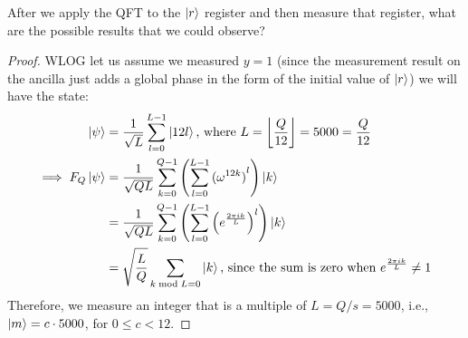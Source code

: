 \begin{solution}[label=ques:3d]
  \begin{question}
    After we apply the QFT to the $\ket{r}$ register and then measure that register, what are the possible results that we could observe?
  \end{question}
  \tcblower{}
  \begin{proof}
    WLOG let us assume we measured $y = 1$ (since the measurement result on the ancilla just adds a global phase in the form of the initial value of $\ket{r}$) we will have the state:
    \begin{equation}
      \begin{split}
        \ket{\psi} &= \frac{1}{\sqrt{L}}\sum_{l=0}^{L-1} \ket{12l}\text{, where }L = \left\lfloor\frac{Q}{12}\right\rfloor = 5000 = \frac{Q}{12}\\
        \implies F_Q\ket{\psi} &= \frac{1}{\sqrt{QL}}\sum_{k=0}^{Q-1}\left(\sum_{l=0}^{L-1}{(\omega^{12k})}^{l}\right)\ket{k}\\
        &= \frac{1}{\sqrt{QL}}\sum_{k=0}^{Q-1}\left(\sum_{l=0}^{L-1}{\left(e^{\frac{2\pi ik}{L}}\right)}^{l}\right)\ket{k}\\
        &= \sqrt{\frac{L}{Q}}\sum_{k \bmod L = 0}\ket{k}\text{, since the sum is zero when }e^{\frac{2\pi ik}{L}} \neq 1
      \end{split}
      \label{eq:qftgen}
    \end{equation}
    Therefore, we measure an integer that is a multiple of $L = Q / s = 5000$, i.e., $\ket{m} = c\cdot 5000$, for $0\leq c < 12$.
  \end{proof}
\end{solution}
